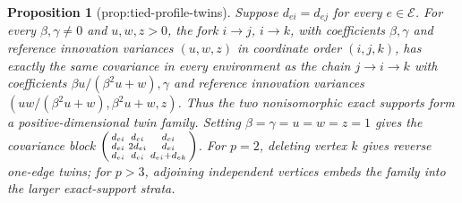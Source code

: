 \documentclass{article}
\newtheorem{proposition}{Proposition}
\begin{document}
\begin{proposition}[prop:tied-profile-twins]\label{prop:tied-profile-twins}
Suppose \(d_{ei}=d_{ej}\) for every \(e\in\mathcal E\). For every \(\beta,\gamma\ne0\) and \(u,w,z>0\), the fork \(i\to j\), \(i\to k\), with coefficients \(\beta,\gamma\) and reference innovation variances \((u,w,z)\) in coordinate order \((i,j,k)\), has exactly the same covariance in every environment as the chain \(j\to i\to k\) with coefficients \(\beta u/(\beta^2u+w),\gamma\) and reference innovation variances \((uw/(\beta^2u+w),\beta^2u+w,z)\). Thus the two nonisomorphic exact supports form a positive-dimensional twin family. Setting \(\beta=\gamma=u=w=z=1\) gives the covariance block \(\begin{psmallmatrix}d_{ei}&d_{ei}&d_{ei}\\d_{ei}&2d_{ei}&d_{ei}\\d_{ei}&d_{ei}&d_{ei}+d_{ek}\end{psmallmatrix}\). For \(p=2\), deleting vertex \(k\) gives reverse one-edge twins; for \(p>3\), adjoining independent vertices embeds the family into the larger exact-support strata.
\end{proposition}
\end{document}
